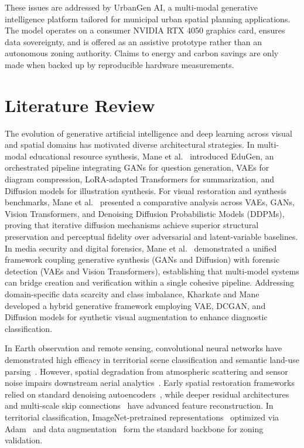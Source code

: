 \documentclass[conference]{IEEEtran}
\begin{document}
These issues are addressed by UrbanGen AI, a multi-modal generative intelligence platform tailored for municipal urban spatial planning applications. The model operates on a consumer NVIDIA RTX 4050 graphics card, ensures data sovereignty, and is offered as an assistive prototype rather than an autonomous zoning authority. Claims to energy and carbon savings are only made when backed up by reproducible hardware measurements.

\section{Literature Review}
The evolution of generative artificial intelligence and deep learning across visual and spatial domains has motivated diverse architectural strategies. In multi-modal educational resource synthesis, Mane et al.~\cite{mane2026edugen} introduced EduGen, an orchestrated pipeline integrating GANs for question generation, VAEs for diagram compression, LoRA-adapted Transformers for summarization, and Diffusion models for illustration synthesis. For visual restoration and synthesis benchmarks, Mane et al.~\cite{mane2026colorization} presented a comparative analysis across VAEs, GANs, Vision Transformers, and Denoising Diffusion Probabilistic Models (DDPMs), proving that iterative diffusion mechanisms achieve superior structural preservation and perceptual fidelity over adversarial and latent-variable baselines. In media security and digital forensics, Mane et al.~\cite{mane2026unified} demonstrated a unified framework coupling generative synthesis (GANs and Diffusion) with forensic detection (VAEs and Vision Transformers), establishing that multi-model systems can bridge creation and verification within a single cohesive pipeline. Addressing domain-specific data scarcity and class imbalance, Kharkate and Mane~\cite{kharkate2026skin} developed a hybrid generative framework employing VAE, DCGAN, and Diffusion models for synthetic visual augmentation to enhance diagnostic classification.

In Earth observation and remote sensing, convolutional neural networks have demonstrated high efficacy in territorial scene classification and semantic land-use parsing~\cite{cheng2017remote,yang2010bag,long2015fully}. However, spatial degradation from atmospheric scattering and sensor noise impairs downstream aerial analytics~\cite{tuia2016domain}. Early spatial restoration frameworks relied on standard denoising autoencoders~\cite{vincent2008extracting}, while deeper residual architectures~\cite{he2016deep} and multi-scale skip connections~\cite{ronneberger2015u,zhang2017beyond} have advanced feature reconstruction. In territorial classification, ImageNet-pretrained representations~\cite{krizhevsky2012imagenet} optimized via Adam~\cite{kingma2014adam} and data augmentation~\cite{perez2017effectiveness} form the standard backbone for zoning validation.
\end{document}
